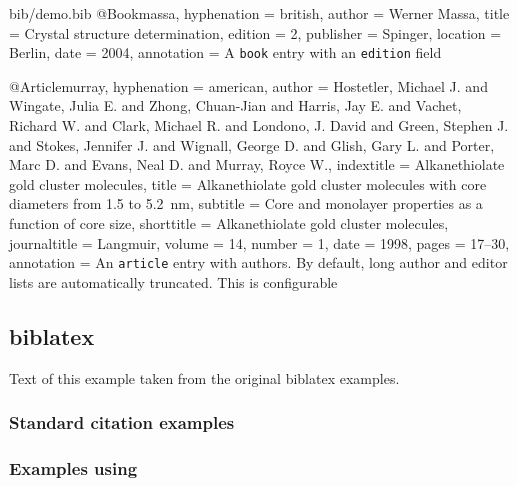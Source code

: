 \begin{filecontents*}{bib/demo.bib}
@Book{massa,
  hyphenation = {british},
  author	  = {Werner Massa},
  title		  = {Crystal structure determination},
  edition	  = {2},
  publisher	  = {Spinger},
  location	  = {Berlin},
  date		  = {2004},
  annotation  = {A \texttt{book} entry with an \texttt{edition} field}
}

@Article{murray,
  hyphenation  = {american},
  author	  = {Hostetler, Michael J. and Wingate, Julia E. and Zhong,
    Chuan-Jian and Harris, Jay E. and Vachet, Richard W. and Clark, Michael R.
    and Londono, J. David and Green, Stephen J. and Stokes, Jennifer J. and
    Wignall, George D. and Glish, Gary L. and Porter, Marc D. and Evans, Neal
    D. and Murray, Royce W.},
  indextitle  = {Alkanethiolate gold cluster molecules},
  title		  = {Alkanethiolate gold cluster molecules with core diameters from 1.5 to 5.2~nm},
  subtitle	  = {Core and monolayer properties as a function of core size},
  shorttitle  = {Alkanethiolate gold cluster molecules},
  journaltitle	= {Langmuir},
  volume	  = {14},
  number	  = {1},
  date		  = {1998},
  pages		  = {17--30},
  annotation  = {An \texttt{article} entry with  authors. By
    default, long author and editor lists are automatically truncated. This is
    configurable}
}
\end{filecontents*}

\subsection{biblatex}
Text of this example taken from the original biblatex examples.

\subsubsection{Standard citation examples}

\begin{filecontents*}{\democodefile}
\cite{companion}
\cite[59]{companion}
\cite[see][]{companion}
\cite[see][59--63]{companion}
\end{filecontents*}

%


\subsubsection{Examples using }

